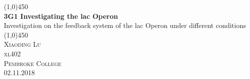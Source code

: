 \documentclass{article}
\begin{document}
\begin{titlepage}
	\begin{center}
	\line(1,0){450}\\
	[0.25in]
	\huge{\bfseries 3G1 Investigating the lac Operon} \\
	[0.25in]
     \large Investigation on the feedback system of the lac Operon under different conditions\\
     \line(1,0){450} \\
	[12cm]
	\textsc{\Large Xiaoding Lu \\[1cm] xl402 \\ Pembroke College \\[1.2cm] 02.11.2018}\\
	\end{center}
	\begin{flushright}

	\begin{figure}[htp]
	\begin{flushright}
	\end{flushright}
	\end{figure}
	\end{flushright}

\vspace{2cm}

\end{titlepage}

\cleardoublepage
{}
\cleardoublepage
{}
\end{document}
